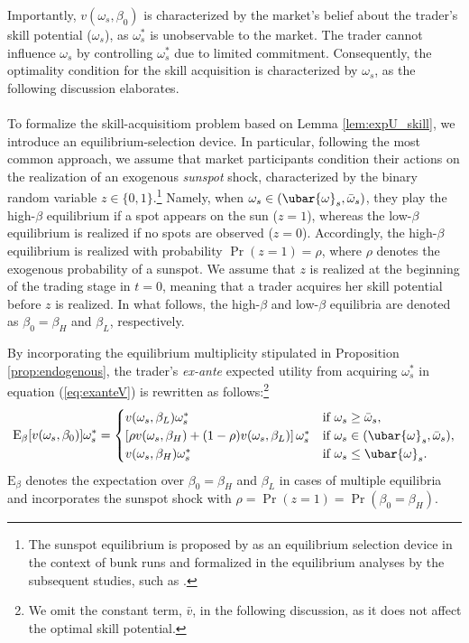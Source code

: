 Importantly, $v(\omega_{s},\beta_{0})$ is characterized by the market's belief about the trader's skill potential ($\omega_{s}$), as $\omega_{s}^{*}$ is unobservable to the market. The trader cannot influence $\omega_{s}$ by controlling $\omega_{s}^{*}$ due to limited commitment. Consequently, the optimality condition for the skill acquisition is characterized by $\omega_{s}$, as the following discussion elaborates.

\paragraph{}
To formalize the skill-acquisitiom problem based on Lemma \ref{lem:expU_skill}, we introduce an equilibrium-selection device. In particular, following the most common approach, we assume that market participants condition their actions on the realization of an exogenous \textit{sunspot} shock, characterized by the binary random variable $z\in\{0,1\}$.\footnote{The sunspot equilibrium is proposed by \citet{diamond1983bank} as an equilibrium selection device in the context of bunk runs and formalized in the equilibrium analyses by the subsequent studies, such as \citet{cooper1998bank}.} Namely, when $\omega_{s}\in (\ubar{\omega}_{s},\bar{\omega}_{s})$, they play the high-$\beta$ equilibrium if a spot appears on the sun ($z=1$), whereas the low-$\beta$ equilibrium is realized if no spots are observed ($z=0$). Accordingly, the high-$\beta$ equilibrium is realized with probability $\Pr(z=1)=\rho$, where $\rho$ denotes the exogenous probability of a sunspot. We assume that $z$ is realized at the beginning of the trading stage in $t=0$, meaning that a trader acquires her skill potential before $z$ is realized. In what follows, the high-$\beta$ and low-$\beta$ equilibria are denoted as $\beta_{0} = \beta_{H}$ and $\beta_{L}$, respectively.

By incorporating the equilibrium multiplicity stipulated in Proposition \ref{prop:endogenous}, the trader's \textit{ex-ante} expected utility from acquiring $\omega_{s}^{*}$ in equation (\ref{eq:exanteV}) is rewritten as follows:\footnote{We omit the constant term, $\bar{v}$, in the following discussion, as it does not affect the optimal skill potential.}
\begin{equation}
\mathrm{E}_{\beta}[v(\omega_{s},\beta_{0})]\omega_{s}^{*}  = 
\begin{cases}
v(\omega_{s},\beta_{L}) \omega_{s}^{*} & \text{if } \omega_{s} \geq \bar{\omega}_{s}, \\
\left[\rho v(\omega_{s},\beta_{H}) + (1-\rho) v(\omega_{s},\beta_{L})\right]\omega_{s}^{*} & \text{if } \omega_{s} \in (\ubar{\omega}_{s}, \bar{\omega}_{s}), \\
v(\omega_{s},\beta_{H}) \omega_{s}^{*} & \text{if } \omega_{s} \leq \ubar{\omega}_{s}.
\end{cases}
\label{eq:barV_2}
\end{equation}
$\mathrm{E}_{\beta}$ denotes the expectation over  $\beta_{0} = \beta_{H}$ and $\beta_{L}$ in cases of multiple equilibria and incorporates the sunspot shock with $\rho = \Pr(z=1) = \Pr(\beta_{0}=\beta_{H})$. 

